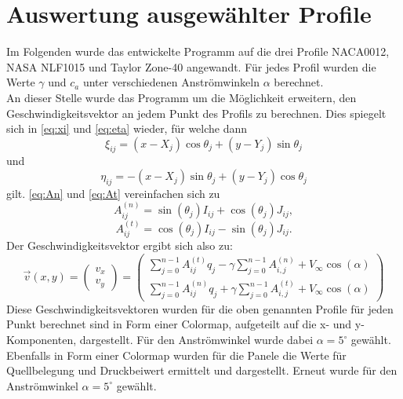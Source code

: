 \section{Auswertung ausgewählter Profile}
Im Folgenden wurde das entwickelte Programm auf die drei Profile NACA0012, NASA NLF1015 und Taylor Zone-40 angewandt. Für jedes Profil wurden die Werte $\gamma$ und $c_a$ unter verschiedenen Anströmwinkeln $\alpha $ berechnet. \\
An dieser Stelle wurde das Programm um die Möglichkeit erweitern, den Geschwindigkeitsvektor an jedem Punkt des Profils zu berechnen. Dies spiegelt sich in \eqref{eq:xi} und \eqref{eq:eta} wieder, für welche dann
\begin{equation}
\xi_{ij} =  (x - X_j) \cos \theta _j + (y - Y_j) \sin \theta _j
\end{equation}
und
\begin{equation}
\eta_{ij} =  -(x - X_j) \sin \theta _j + (y - Y_j) \cos \theta _j
\end{equation}
gilt. \eqref{eq:An} und \eqref{eq:At} vereinfachen sich zu
\begin{equation}
A_{ij}^{(n)} = \sin {(\theta _j)} I_{ij} + \cos{( \theta _j)} J_{ij},
\end{equation}
\begin{equation}
A_{ij}^{(t)} =  \cos{(\theta _j)} I_{ij} - \sin{( \theta _j)} J_{ij}.
\end{equation}
Der Geschwindigkeitsvektor ergibt sich also zu:
\begin{equation}
\vec v (x,y) = 
\begin{pmatrix}
v_x \\
v_y
\end{pmatrix}
=
\begin{pmatrix}
\sum_{j=0}^{n-1} A_{ij}^{(t)} q_j - \gamma \sum_{j=0}^{n-1}A_{i,j}^{(n)} + V_{\infty} \cos{(\alpha)} \\
\sum_{j=0}^{n-1} A_{ij}^{(n)} q_j + \gamma \sum_{j=0}^{n-1}A_{i,j}^{(t)} + V_{\infty} \cos{(\alpha)}
\end{pmatrix}
\end{equation}
Diese Geschwindigkeitsvektoren wurden für die oben genannten Profile für jeden Punkt berechnet sind in Form einer Colormap, aufgeteilt auf die x- und y-Komponenten, dargestellt. Für den Anströmwinkel wurde dabei $\alpha =5^{\circ}$ gewählt. \\
Ebenfalls in Form einer Colormap wurden für die Panele die Werte für Quellbelegung und Druckbeiwert ermittelt und dargestellt. Erneut wurde für den Anströmwinkel $\alpha =5^{\circ}$ gewählt.

